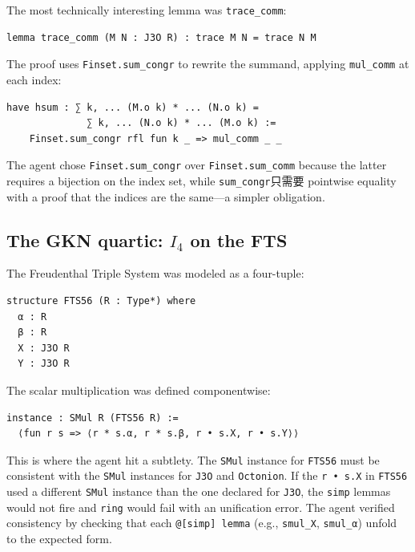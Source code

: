 \documentclass[11pt]{article}
\theoremstyle{definition}
\newcommand{\Iq}{I_4}
\begin{document}
The most technically interesting lemma was \texttt{trace\_comm}:

\begin{lstlisting}[language=leanL]
lemma trace_comm (M N : J3O R) : trace M N = trace N M
\end{lstlisting}

The proof uses \texttt{Finset.sum\_congr} to rewrite the summand,
applying \texttt{mul\_comm} at each index:

\begin{lstlisting}[language=leanL]
  have hsum : ∑ k, ... (M.o k) * ... (N.o k) =
              ∑ k, ... (N.o k) * ... (M.o k) :=
    Finset.sum_congr rfl fun k _ => mul_comm _ _
\end{lstlisting}

The agent chose \texttt{Finset.sum\_congr} over \texttt{Finset.sum\_comm}
because the latter requires a bijection on the index set, while
\texttt{sum\_congr}只需要 pointwise equality with a proof that the
indices are the same---a simpler obligation.

\subsection{The GKN quartic: $\Iq$ on the FTS}
\label{sec:agent-i4}

The Freudenthal Triple System was modeled as a four-tuple:

\begin{lstlisting}[language=leanL]
structure FTS56 (R : Type*) where
  α : R
  β : R
  X : J3O R
  Y : J3O R
\end{lstlisting}

The scalar multiplication was defined componentwise:

\begin{lstlisting}[language=leanL]
instance : SMul R (FTS56 R) :=
  ⟨fun r s => ⟨r * s.α, r * s.β, r • s.X, r • s.Y⟩⟩
\end{lstlisting}

This is where the agent hit a subtlety. The \texttt{SMul} instance for
\texttt{FTS56} must be consistent with the \texttt{SMul} instances for
\texttt{J3O} and \texttt{Octonion}. If the \texttt{r • s.X} in
\texttt{FTS56} used a different \texttt{SMul} instance than the one
declared for \texttt{J3O}, the \texttt{simp} lemmas would not fire and
\texttt{ring} would fail with an unification error. The agent verified
consistency by checking that each \texttt{@[simp] lemma} (e.g.,
\texttt{smul\_X}, \texttt{smul\_α}) unfold to the expected form.
\end{document}
